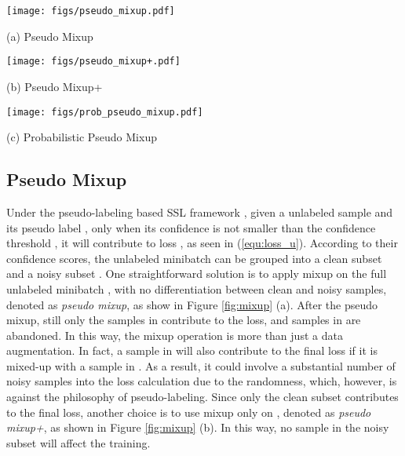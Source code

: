 \documentclass{article}
\begin{document}
\begin{figure*}[t!]
\begin{minipage}[b]{.32\linewidth}
\centering
\centerline{\texttt{[image: figs/pseudo\_mixup.pdf]}}{(a) Pseudo Mixup}
\end{minipage}
\hfill
\begin{minipage}[b]{.32\linewidth}
\centering
\centerline{\texttt{[image: figs/pseudo\_mixup+.pdf]}}{(b) Pseudo Mixup+}
\end{minipage}
\hfill
\begin{minipage}[b]{.32\linewidth}
\centering
\centerline{\texttt{[image: figs/prob\_pseudo\_mixup.pdf]}}{(c) Probabilistic Pseudo Mixup}
\end{minipage}
\caption{Different variations of mixup on unlabeled data. The red samples are the ones passing the confidence threshold, but not the blue samples.}
\label{fig:mixup}
\end{figure*}

\subsection{Pseudo Mixup}
\label{subse:pseudo mixup}

Under the pseudo-labeling based SSL framework \cite{lee2013pseudo,DBLP:conf/nips/SohnBCZZRCKL20,DBLP:conf/cvpr/PhamDXL21,DBLP:conf/cvpr/CaiRMFTS21}, given a unlabeled sample and its pseudo label , only when its confidence  is not smaller than the confidence threshold , 
it will contribute to loss , as seen in (\ref{equ:loss_u}). According to their confidence scores, the unlabeled minibatch  can be grouped into a clean subset  and a noisy subset . 
One straightforward solution is to apply mixup on the full unlabeled minibatch , with no differentiation between clean and noisy samples, denoted as \emph{pseudo mixup}, as show in Figure \ref{fig:mixup} (a). After the pseudo mixup, still only the samples in  contribute to the loss, and samples in  are abandoned. In this way, the mixup operation is more than just a data augmentation. In fact, a sample in  will also contribute to the final loss if it is mixed-up with a sample in . As a result, it could involve a substantial number of noisy samples into the loss calculation due to the randomness, which, however, is against the philosophy of pseudo-labeling. Since only the clean subset  contributes to the final loss, another choice is to use mixup only on , denoted as \emph{pseudo mixup+}, as shown in Figure \ref{fig:mixup} (b). In this way, no sample in the noisy subset  will affect the training. 
\end{document}
